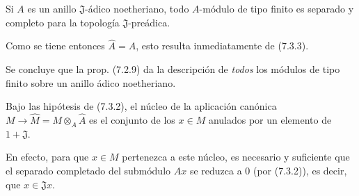 \begin{corollary}[7.3.6]
\label{0.7.3.6-fr}
Si $A$ es un anillo $\mathfrak J$-ádico noetheriano, todo $A$-módulo de tipo
finito es separado y completo para la topología $\mathfrak J$-preádica.
\end{corollary}

Como se tiene entonces $\widehat A=A$, esto resulta inmediatamente de (7.3.3).

Se concluye que la prop. (7.2.9) da la descripción de \emph{todos} los
módulos de tipo finito sobre un anillo ádico noetheriano.

\begin{corollary}[7.3.7]
\label{0.7.3.7-fr}
Bajo las hipótesis de \textup{(7.3.2)}, el núcleo de la aplicación canónica
$M\to\widehat M=M\otimes_A\widehat A$ es el conjunto de los $x\in M$ anulados por
un elemento de $1+\mathfrak J$.
\end{corollary}

En efecto, para que $x\in M$ pertenezca a este núcleo, es necesario y suficiente que
el separado completado del submódulo $Ax$ se reduzca a 0 (por (7.3.2)), es decir,
que $x\in\mathfrak Jx$.

